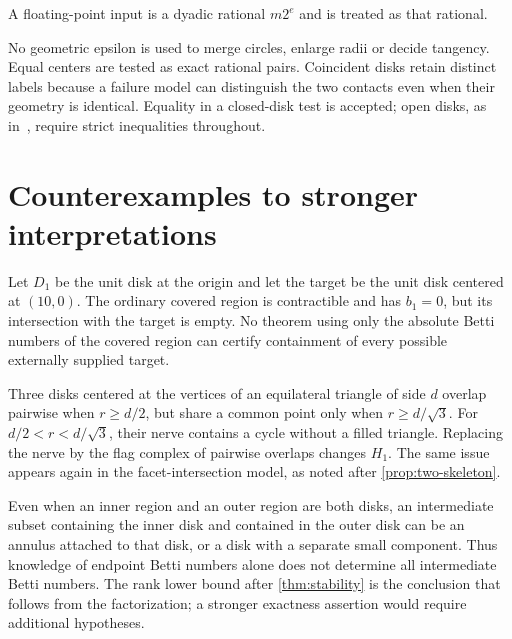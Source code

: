 A floating-point input is a dyadic rational $m2^e$ and is treated as that rational.

No geometric epsilon is used to merge circles, enlarge radii or decide tangency. Equal centers are tested as exact rational pairs. Coincident disks retain distinct labels because a failure model can distinguish the two contacts even when their geometry is identical. Equality in a closed-disk test is accepted; open disks, as in~\cite{ecog}, require strict inequalities throughout.

\section{Counterexamples to stronger interpretations}
\label{app:counterexamples}
\begin{example}
Let $D_1$ be the unit disk at the origin and let the target be the unit disk centered at $(10,0)$. The ordinary covered region is contractible and has $b_1=0$, but its intersection with the target is empty. No theorem using only the absolute Betti numbers of the covered region can certify containment of every possible externally supplied target.
\end{example}

\begin{example}
Three disks centered at the vertices of an equilateral triangle of side $d$ overlap pairwise when $r\ge d/2$, but share a common point only when $r\ge d/\sqrt3$. For $d/2<r<d/\sqrt3$, their nerve contains a cycle without a filled triangle. Replacing the nerve by the flag complex of pairwise overlaps changes $H_1$. The same issue appears again in the facet-intersection model, as noted after \cref{prop:two-skeleton}.
\end{example}

\begin{example}
Even when an inner region and an outer region are both disks, an intermediate subset containing the inner disk and contained in the outer disk can be an annulus attached to that disk, or a disk with a separate small component. Thus knowledge of endpoint Betti numbers alone does not determine all intermediate Betti numbers. The rank lower bound after \cref{thm:stability} is the conclusion that follows from the factorization; a stronger exactness assertion would require additional hypotheses.
\end{example}

